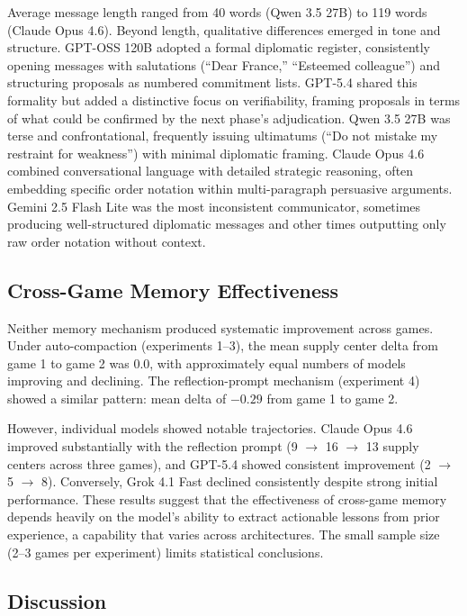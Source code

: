 \documentclass[a4paper,oneside,bibliography=totoc]{scrartcl}
\begin{document}
Average message length ranged from 40 words (Qwen 3.5 27B) to 119 words (Claude Opus 4.6). Beyond length, qualitative differences emerged in tone and structure. GPT-OSS 120B adopted a formal diplomatic register, consistently opening messages with salutations (``Dear France,'' ``Esteemed colleague'') and structuring proposals as numbered commitment lists. GPT-5.4 shared this formality but added a distinctive focus on verifiability, framing proposals in terms of what could be confirmed by the next phase's adjudication. Qwen 3.5 27B was terse and confrontational, frequently issuing ultimatums (``Do not mistake my restraint for weakness'') with minimal diplomatic framing. Claude Opus 4.6 combined conversational language with detailed strategic reasoning, often embedding specific order notation within multi-paragraph persuasive arguments. Gemini 2.5 Flash Lite was the most inconsistent communicator, sometimes producing well-structured diplomatic messages and other times outputting only raw order notation without context.

\subsection{Cross-Game Memory Effectiveness}

Neither memory mechanism produced systematic improvement across games. Under auto-compaction (experiments 1--3), the mean supply center delta from game 1 to game 2 was 0.0, with approximately equal numbers of models improving and declining. The reflection-prompt mechanism (experiment 4) showed a similar pattern: mean delta of $-0.29$ from game 1 to game 2.

However, individual models showed notable trajectories. Claude Opus 4.6 improved substantially with the reflection prompt (9 $\rightarrow$ 16 $\rightarrow$ 13 supply centers across three games), and GPT-5.4 showed consistent improvement (2 $\rightarrow$ 5 $\rightarrow$ 8). Conversely, Grok 4.1 Fast declined consistently despite strong initial performance. These results suggest that the effectiveness of cross-game memory depends heavily on the model's ability to extract actionable lessons from prior experience, a capability that varies across architectures. The small sample size (2--3 games per experiment) limits statistical conclusions.

\subsection{Discussion}
\end{document}
